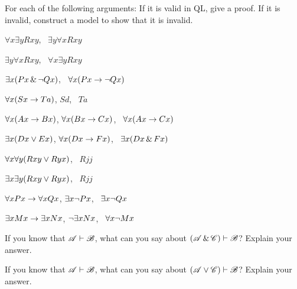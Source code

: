 \solutions
\problempart
\label{pr.QLvalidornot}
For each of the following arguments: If it is valid in QL, give a proof. If it is invalid, construct a model to show that it is invalid.
\begin{earg}
\item $\forall x\exists y Rxy$, \therefore\ $\exists y\forall x Rxy$
\item $\exists y\forall x Rxy$, \therefore\ $\forall x\exists y Rxy$
\item $\exists x(Px \,\&\, \neg Qx)$, \therefore\ $\forall x(Px \rightarrow \neg Qx)$
\item $\forall x(Sx \rightarrow Ta)$, $Sd$, \therefore\ $Ta$
\item $\forall x(Ax\rightarrow Bx)$, $\forall x(Bx \rightarrow Cx)$, \therefore\ $\forall x(Ax \rightarrow Cx)$
\item $\exists x(Dx \vee Ex)$, $\forall x(Dx \rightarrow Fx)$, \therefore\ $\exists x(Dx \,\&\, Fx)$
\item $\forall x\forall y(Rxy \vee Ryx)$, \therefore\ $Rjj$
\item $\exists x\exists y(Rxy \vee Ryx)$, \therefore\ $Rjj$
\item $\forall x Px \rightarrow \forall x Qx$, $\exists x \neg Px$, \therefore\ $\exists x \neg Qx$
\item $\exists x Mx \rightarrow \exists x Nx$, $\neg \exists x Nx$, \therefore\ $\forall x \neg Mx$
\end{earg}






\problempart
\begin{earg}
\item If you know that $\mathscr{A}\vdash\mathscr{B}$, what can you say about $(\mathscr{A}\,\&\,\mathscr{C})\vdash\mathscr{B}$? Explain your answer.
\item If you know that $\mathscr{A}\vdash\mathscr{B}$, what can you say about $(\mathscr{A}\vee\mathscr{C})\vdash\mathscr{B}$? Explain your answer.
\end{earg}




